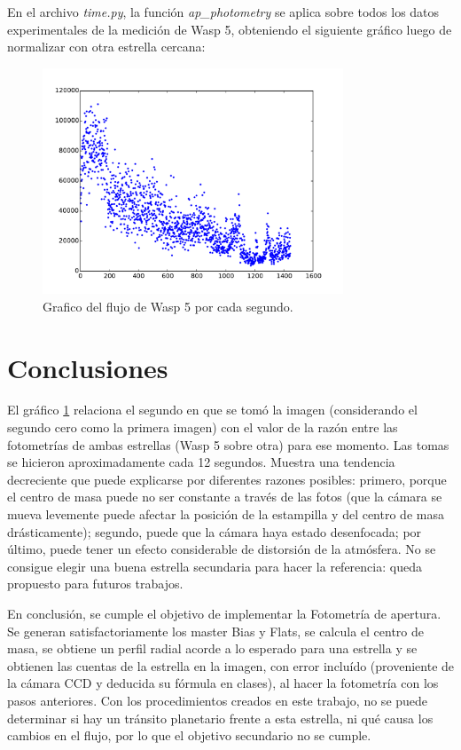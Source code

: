 \documentclass[a4paper, 11pt, spanish]{article}
\begin{document}
En el archivo \textit{time.py}, la funci\'on \textit{ap\_photometry} se aplica sobre todos los datos experimentales de la medici\'on  de Wasp 5, obteniendo el siguiente gr\'afico luego de normalizar con otra estrella cercana:

\begin{figure}[!htbp]
		\centering
		\includegraphics[width=0.8\textwidth]{img/flujo.pdf}
		\caption{Grafico del flujo de Wasp 5 por cada segundo.}
		\label{fig:star}
	\end{figure}


\section{Conclusiones}


El gr\'afico \ref{fig:star} relaciona el segundo en que se tom\'o la imagen (considerando el segundo cero como la primera imagen) con el valor de la raz\'on entre las fotometr\'ias de ambas estrellas (Wasp 5 sobre otra) para ese momento. Las tomas se hicieron aproximadamente cada 12 segundos. Muestra una tendencia decreciente que puede explicarse por diferentes razones posibles: primero, porque el centro de masa puede no ser constante a trav\'es de las fotos (que la c\'amara se mueva levemente puede afectar la posici\'on de la estampilla y del centro de masa dr\'asticamente); segundo, puede que la c\'amara haya estado desenfocada; por \'ultimo, puede tener un efecto considerable de distorsi\'on de la atm\'osfera. No se consigue elegir una buena estrella secundaria para hacer la referencia: queda propuesto para futuros trabajos.

En conclusi\'on, se cumple el objetivo de implementar la Fotometr\'ia de apertura. Se generan satisfactoriamente los master  Bias y Flats, se calcula el centro de masa, se obtiene un perfil radial acorde a lo esperado para una estrella y se obtienen las cuentas de la estrella en la imagen, con error inclu\'ido (proveniente de la c\'amara CCD y deducida su f\'ormula en clases), al hacer la fotometr\'ia con los pasos anteriores. Con los procedimientos creados en este trabajo, no se puede determinar si hay un tr\'ansito planetario frente a esta estrella, ni qu\'e causa los cambios en el flujo, por lo que el objetivo secundario no se cumple. 
\end{document}
